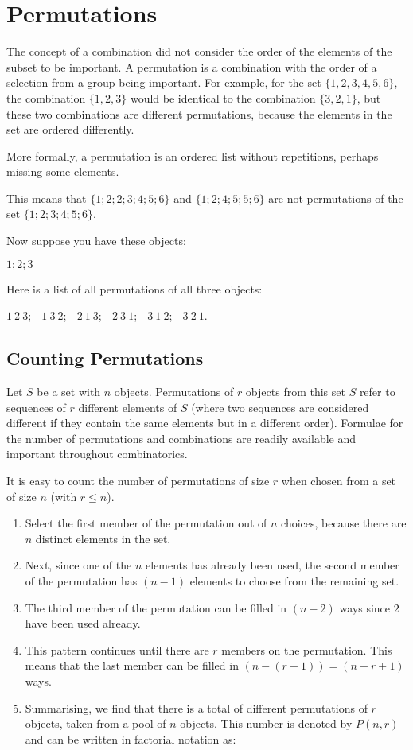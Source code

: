 \section{Permutations}
The concept of a combination did not consider the order of the elements of the subset to be important. A permutation is a combination with the order of a selection from a group being important. For example, for the set $\{1, 2, 3, 4, 5, 6\}$, the combination $\{1, 2, 3\}$ would be identical to the combination $\{3, 2, 1\}$, but these two combinations are different permutations, because the elements in the set are ordered differently.

More formally, a permutation is an ordered list without repetitions, perhaps missing some elements.

This means that $\{1; 2; 2; 3; 4; 5; 6\}$ and $\{1; 2; 4; 5; 5; 6\}$ are not permutations of the set $\{1; 2; 3; 4; 5; 6\}$.

Now suppose you have these objects:

$1; 2; 3$

Here is a list of all permutations of all three objects:

$1~2~3$; $\;$
$1~3~2$; $\;$
$2~1~3$; $\;$
$2~3~1$; $\;$
$3~1~2$; $\;$
$3~2~1$. $\;$

\subsection{Counting Permutations}
Let $S$ be a set with $n$ objects. Permutations of $r$ objects from this set $S$ refer to sequences of $r$ different elements of $S$ (where two sequences are considered different if they contain the same elements but in a different order). Formulae for the number of permutations and combinations are readily available and important throughout combinatorics.

It is easy to count the number of permutations of size $r$ when chosen from a set of size $n$ (with $r \le n$).

\begin{enumerate}
\item{Select the first member of the permutation out of $n$ choices, because there are $n$ distinct elements in the set.}
\item{Next, since one of the $n$ elements has already been used, the second member of the permutation has $(n - 1)$ elements to choose from the remaining set.}
\item{The third member of the permutation can be filled in $(n - 2)$ ways since $2$ have been used already.}
\item{This pattern continues until there are $r$ members on the permutation. This means that the last member can be filled in $(n - (r - 1) ) = (n - r + 1)$ ways.}
\item{Summarising, we find that there is a total of
different permutations of $r$ objects, taken from a pool of $n$ objects. This number is denoted by $P(n, r)$ and can be written in factorial notation as:
}
\end{enumerate}

